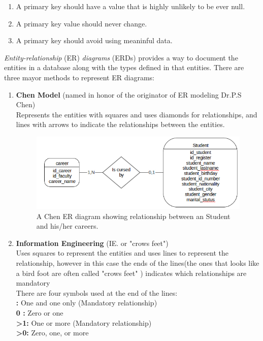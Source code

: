 \documentclass[11pt]{article}
\begin{document}
\begin{enumerate}
	\item A primary key should have a value that is highly unlikely to be ever null.
	\item A primary key value should never change.
	\item A primary key should avoid using meaninful data.
\end{enumerate}

\textit{Entity-relationship} (ER) \textit{diagrams} (ERDs) provides a way to document the entities in a database along with the types
defined in that entities. There are three mayor methods to represent ER diagrams:

\begin{enumerate}
	\item \textbf{Chen Model} (named in honor of the originator of ER modeling Dr.P.S Chen)\\
	      Represents the entities with squares and uses diamonds for relationships, and lines with arrows
	      to indicate the relationships between the entities.

	      \begin{figure}[H]
	      	\centering
	      	\includegraphics[width=12cm]{peterchennotation}
	      	\caption{A Chen ER diagram showing relationship between an Student and his/her careers.}
	      \end{figure}

	\item \textbf{Information Engineering} (IE. or "crows feet")\\
	      Uses squares to represent the entities and uses lines to represent the relationship, however in this
	      case the ends of the lines(the ones that looks like a bird foot are often called "crows feet" ) indicates which relationships are mandatory\\
	      There are four symbols used at the end of the lines:\\

	      \textbf{\textbar\textbar:} One and one only (Mandatory relationship)\\
	      \textbf{0 \textbar:} Zero or one\\
	      \textbf{\textgreater 1:} One or more (Mandatory relationship)\\
	      \textbf{\textgreater 0:} Zero, one, or more\\


\end{enumerate}
\end{document}
